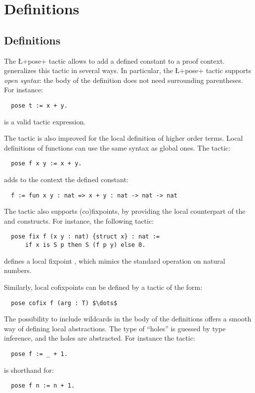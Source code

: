 \section{Definitions}

\subsection{Definitions}\label{ssec:pose}

The \L+pose+ tactic allows to add a defined constant to a
proof context. \ssr{} generalizes this tactic in several ways.
In particular, the \ssr{} \L+pose+ tactic supports \emph{open syntax}:
the body of
the definition does not need surrounding parentheses. For instance:
\begin{lstlisting}
  pose t := x + y.
\end{lstlisting}
is a valid tactic expression.

The  tactic is also improved for the
local definition of higher order terms.
Local definitions of functions can use the same syntax as
global ones. The tactic:
\begin{lstlisting}
  pose f x y := x + y.
\end{lstlisting}
adds to the context the defined constant:
\begin{lstlisting}
  f := fun x y : nat => x + y : nat -> nat -> nat
\end{lstlisting}

The \ssr{}  tactic also supports (co)fixpoints,
by providing the local counterpart of the
 and  constructs.
For instance, the following tactic:
\begin{lstlisting}
  pose fix f (x y : nat) {struct x} : nat :=
      if x is S p then S (f p y) else 0.
\end{lstlisting}
defines a local fixpoint , which mimics the standard 
operation on natural numbers.

Similarly, local cofixpoints can be defined by a tactic of the form:
\begin{lstlisting}
  pose cofix f (arg : T) $\dots$
\end{lstlisting}

The possibility to include wildcards in the body of the definitions
 offers a smooth
way of defining local abstractions. The type of ``holes'' is
guessed by type inference, and the holes are abstracted.
For instance the tactic:
\begin{lstlisting}
  pose f := _ + 1.
\end{lstlisting}
is shorthand for:
\begin{lstlisting}
  pose f n := n + 1.
\end{lstlisting}


